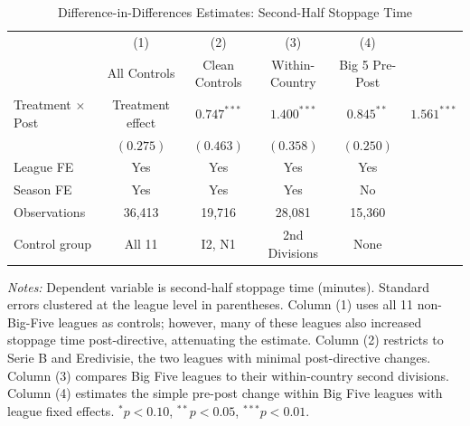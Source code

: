\begin{table}[t]
\centering
\caption{Difference-in-Differences Estimates: Second-Half Stoppage Time}
\label{tab:did}
\small
\begin{tabular}{lcccc}
\toprule
 & (1) & (2) & (3) & (4) \\
 & All Controls & Clean Controls & Within-Country & Big 5 Pre-Post \\
\midrule
Treatment $\times$ Post & Treatment effect & $0.747^{***}$ & $1.400^{***}$ & $0.845^{**}$ & $1.561^{***}$ \\
 & $(0.275)$ & $(0.463)$ & $(0.358)$ & $(0.250)$ \\
\midrule
League FE & Yes & Yes & Yes & Yes \\
Season FE & Yes & Yes & Yes & No \\
Observations & 36,413 & 19,716 & 28,081 & 15,360 \\
Control group & All 11 & I2, N1 & 2nd Divisions & None \\
\bottomrule
\end{tabular}
\begin{tablenotes}\small
\item \textit{Notes:} Dependent variable is second-half stoppage time (minutes). Standard errors clustered at the league level in parentheses. Column (1) uses all 11 non-Big-Five leagues as controls; however, many of these leagues also increased stoppage time post-directive, attenuating the estimate. Column (2) restricts to Serie B and Eredivisie, the two leagues with minimal post-directive changes. Column (3) compares Big Five leagues to their within-country second divisions. Column (4) estimates the simple pre-post change within Big Five leagues with league fixed effects. $^{*}p<0.10$, $^{**}p<0.05$, $^{***}p<0.01$.
\end{tablenotes}
\end{table}
